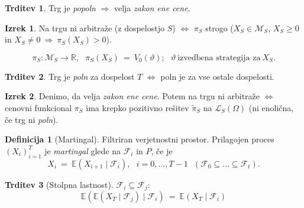 \documentclass[11pt]{article}
\newcommand{\R}{\mathbb{R}}
\newcommand{\E}{\mathbb{E}}
\newcommand{\M}{\mathcal{M}}
\newcommand{\F}{\mathcal{F}}
\newcommand{\1}{\mathbbm{1}}
\theoremstyle{definition}
\newtheorem{definicija}{Definicija}[section]
\theoremstyle{definition}
\newtheorem{trditev}{Trditev}[section]
\newtheorem{izrek}{Izrek}[section]
\begin{document}
\begin{trditev}

Trg je \textit{popoln} $\Longrightarrow$ velja \textit{zakon ene cene}.

\end{trditev}
\vspace{0.5cm}

\begin{izrek}

Na trgu ni arbitraže (z dospelostjo $S$) $\iff$ $\pi_S$ strogo (\hbox{$X_S \in \M_S$}, $X_S \geq 0$ in $X_S \neq 0 ~\Rightarrow~ \pi_S(X_S) > 0$). 

$$\pi_S: \M_S \rightarrow \R, ~~~\pi_S(X_S) ~=~ V_0(\vartheta); ~~~\vartheta ~\text{izvedbena strategija za}~ X_S.$$

\end{izrek}
\vspace{0.5cm}

\begin{trditev}

Trg je \textit{poln} za dospelost $T$ $\iff$ poln je za vse ostale dospelosti.

\end{trditev}
\vspace{0.5cm}

\begin{izrek}

Denimo, da velja \textit{zakon ene cene}. Potem na trgu ni arbitraže $\iff$ cenovni funkcional $\pi_S$ ima krepko pozitivno rešitev $\tilde{\pi}_S$ na $\mathcal{L}_S(\Omega)$ (ni enolična, če trg ni \textit{poln}).

\end{izrek}
\vspace{0.5cm}

\begin{definicija}[Martingal]

Filtriran verjetnostni prostor. Prilagojen proces $(X_i)_{i=1}^T$ je \textit{martingal} glede na $\F_i$ in $P$, če je 
$$X_i ~=~ \E(X_{i+1} \mid \F_i), ~~~i = 0, \ldots, T-1 ~~~(\F_0 \subseteq \ldots \subseteq \F_t).$$ 

\end{definicija}
\vspace{0.5cm}

\begin{trditev}[Stolpna lastnost]

$\F_i \subseteq \F_j$:
$$\E(\E(X_T \mid \F_j) \mid \F_i) ~=~ \E(X_T \mid \F_i)$$

\end{trditev}
\vspace{0.5cm}
\end{document}
